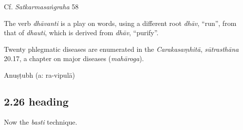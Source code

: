 \begin{ekdosis}
\begin{testimonia}[hp02_025]
Cf. \emph{Satkarmasaṅgraha} 58

\begin{versinnote}
\end{versinnote}

\end{testimonia}

\begin{philcomm}[hp02_025]
The verb \emph{dhāvanti} is a play on words, using a different root \emph{dhāv}, “run”, from that of \emph {dhauti}, which is derived from \emph{dhāv}, “purify”. \lb

Twenty phlegmatic diseases are enumerated in the \emph{Carakasaṃhitā}, \emph{sūtrasthāna} 20.17, a chapter on major diseases (\emph{mahāroga}). %
\end{philcomm}

\begin{metre}[hp02_025]
Anuṣṭubh (a: ra-vipulā)
\end{metre}

\subsection*{2.26 heading}
\begin{translation}[hp02_026a]
Now the \emph{basti} technique.
\end{translation}



\end{ekdosis}
